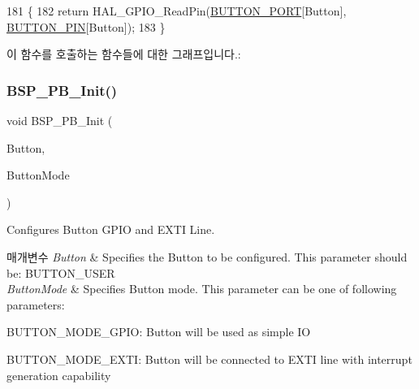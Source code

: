 \begin{DoxyCode}
181 \{
182   \textcolor{keywordflow}{return} HAL\_GPIO\_ReadPin(\mbox{\hyperlink{bsp_8c_ad63ed42b4071e78f80f7462227da4f35}{BUTTON\_PORT}}[Button], \mbox{\hyperlink{bsp_8c_adf78f2d71408a01f8d30929c2d2da82b}{BUTTON\_PIN}}[Button]);
183 \}
\end{DoxyCode}
이 함수를 호출하는 함수들에 대한 그래프입니다.\+:
\mbox{\label{group___s_t_m32_l1_x_x___n_u_c_l_e_o___b_u_t_t_o_n___functions_gad31c8db50a71c1f6dbfe132d72ba0bc6}} 
\subsubsection{\texorpdfstring{B\+S\+P\+\_\+\+P\+B\+\_\+\+Init()}{BSP\_PB\_Init()}}
{\footnotesize\ttfamily void B\+S\+P\+\_\+\+P\+B\+\_\+\+Init (\begin{DoxyParamCaption}\item[{\mbox{\hyperlink{_lory_s_d_k__hw__conf_8h_a643816dfbad5c734fc25a29ce8d35bb1}{Button\+\_\+\+Type\+Def}}}]{Button,  }\item[{\mbox{\hyperlink{_lory_s_d_k__hw__conf_8h_a48825b7c7d851c440ef8e808fd9d8f0a}{Button\+Mode\+\_\+\+Type\+Def}}}]{Button\+Mode }\end{DoxyParamCaption})}



Configures Button G\+P\+IO and E\+X\+TI Line. 


\begin{DoxyParams}{매개변수}
{\em Button} & Specifies the Button to be configured. This parameter should be\+: B\+U\+T\+T\+O\+N\+\_\+\+U\+S\+ER \\
\hline
{\em Button\+Mode} & Specifies Button mode. This parameter can be one of following parameters\+: ~\newline
 \begin{DoxyItemize}
\item B\+U\+T\+T\+O\+N\+\_\+\+M\+O\+D\+E\+\_\+\+G\+P\+IO\+: Button will be used as simple IO \item B\+U\+T\+T\+O\+N\+\_\+\+M\+O\+D\+E\+\_\+\+E\+X\+TI\+: Button will be connected to E\+X\+TI line with interrupt generation capability ~\newline
\end{DoxyItemize}
\\
\hline
\end{DoxyParams}

